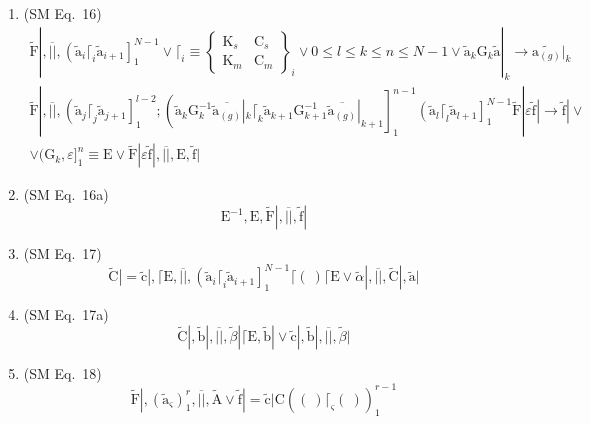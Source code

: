 \documentclass[12pt]{article}
\begin{document}
\begin{enumerate}[label=(\arabic*), series=formellist]
    \item (SM Eq.\ 16) 
    \[
    \begin{gathered}
    \tilde{\mathrm{F}}|, \overline{||}, \left( \tilde{\mathrm{a}}_i \lceil_i \tilde{\mathrm{a}}_{i+1} \right]_{1}^{N-1} \lor \lceil_i \equiv \left\{ \begin{smallmatrix} \mathrm{K}_s & \mathrm{C}_s \\ \mathrm{K}_m & \mathrm{C}_m \end{smallmatrix} \right\}_i \lor 0 \le l \le k \le n \le N-1 \lor \tilde{\mathrm{a}}_k \mathrm{G}_k \tilde{\mathrm{a}}|_k \to \widetilde{\mathrm{a}_{(g)}}|_k \\
    \tilde{\mathrm{F}}|, \overline{||}, \left( \tilde{\mathrm{a}}_j \lceil_j \tilde{\mathrm{a}}_{j+1} \right]_{1}^{l-2} ; \left( \tilde{\mathrm{a}}_k \mathrm{G}_k^{-1} \overline{\tilde{\mathrm{a}}_{(g)}}|_k \lceil_k \tilde{\mathrm{a}}_{k+1} \mathrm{G}_{k+1}^{-1} \overline{\tilde{\mathrm{a}}_{(g)}}|_{k+1} \right]_{1}^{n-1} \left( \tilde{\mathrm{a}}_l \lceil_l \tilde{\mathrm{a}}_{l+1} \right]_{1}^{N-1} \tilde{\mathrm{F}}| \varepsilon \tilde{\mathrm{f}}| \to \tilde{\mathrm{f}}| \lor \\
    \lor (\mathrm{G}_k, \varepsilon]_1^n \equiv \mathrm{E} \lor \tilde{\mathrm{F}}| \varepsilon \tilde{\mathrm{f}}|, \overline{||}, \mathrm{E}, \tilde{\mathrm{f}}|
    \end{gathered}
    \]

    \item (SM Eq.\ 16a) 
    \[
    \mathrm{E}^{-1}, \mathrm{E}, \tilde{\mathrm{F}}|, \overline{||}, \tilde{\mathrm{f}}|
    \]

    \item (SM Eq.\ 17) 
    \[
    \tilde{\mathrm{C}}| = \tilde{\mathrm{c}}|, \lceil \mathrm{E}, \overline{||}, \left( \tilde{\mathrm{a}}_i \lceil_i \tilde{\mathrm{a}}_{i+1} \right]_{1}^{N-1} \lceil (\ ) \lceil \mathrm{E} \lor \tilde{\alpha}|, \overline{||}, \tilde{\mathrm{C}}|, \tilde{\mathrm{a}}|
    \]

    \item (SM Eq.\ 17a) 
    \[
    \tilde{\mathrm{C}}|, \tilde{\mathrm{b}}|, \overline{||}, \tilde{\beta}| \lceil \mathrm{E}, \tilde{\mathrm{b}}| \lor \tilde{\mathrm{c}}|, \tilde{\mathrm{b}}|, \overline{||}, \tilde{\beta}|
    \]

    \item (SM Eq.\ 18) 
    \[
    \tilde{\mathrm{F}}|, \left( \tilde{\mathrm{a}}_\varsigma \right)_1^r, \overline{||}, \tilde{\mathrm{A}} \lor \tilde{\mathrm{f}}| = \tilde{\mathrm{c}}| \mathrm{C} \left( (\ ) \lceil_\varsigma (\ ) \right)_1^{r-1}
    \]


\end{enumerate}
\end{document}
